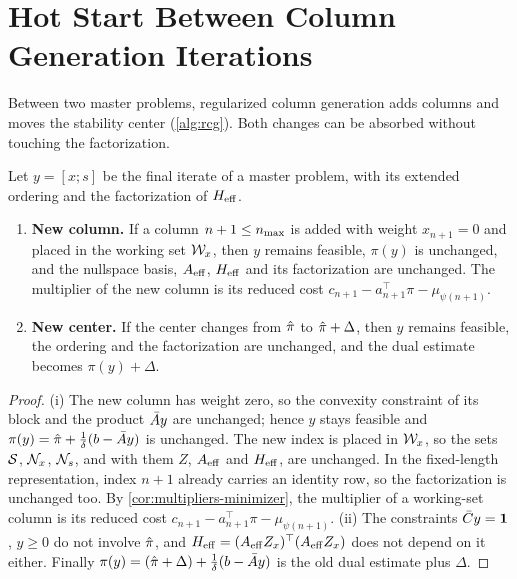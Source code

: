 \section{Hot Start Between Column Generation Iterations}
\label{sec:hot-start}

Between two master problems, regularized column generation adds columns and moves the
stability center (\cref{alg:rcg}). Both changes can be absorbed without touching the
factorization.

\begin{theorem} \label{thm:hot-start}
Let $y = [x;s]$ be the final iterate of a master problem, with its extended ordering and the
factorization of $H_{\mathrm{eff}}$.
\begin{enumerate}
    \item \label{thm:hot-start:i} \textbf{New column.} If a column $n+1\le n_{\max}$ is added with weight $x_{n+1} = 0$
          and placed in the working set $\mathcal{W}_x$, then $y$ remains feasible, $\pi(y)$ is
          unchanged, and the nullspace basis, $A_{\mathrm{eff}}$, $H_{\mathrm{eff}}$ and its factorization are
          unchanged. The multiplier of the new column is its reduced cost
          $c_{n+1} - a_{n+1}^\top\pi - \mu_{\psi(n+1)}$.
    \item \label{thm:hot-start:ii} \textbf{New center.} If the center changes from $\hat{\pi}$ to $\hat{\pi} + \Delta$,
          then $y$ remains feasible, the ordering and the factorization are unchanged, and the
          dual estimate becomes $\pi(y) + \Delta$.
\end{enumerate}
\end{theorem}

\begin{proof}
(i) The new column has weight zero, so the convexity constraint of its block and the product
$\bar{A} y$ are unchanged; hence $y$ stays feasible and $\pi(y) = \hat{\pi} + \frac{1}{\delta}(b - \bar{A} y)$
is unchanged. The new index is placed in $\mathcal{W}_x$, so the sets $\mathcal{S}$, $\mathcal{N}_x$, $\mathcal{N}_s$, and with them
$Z$, $A_{\mathrm{eff}}$ and $H_{\mathrm{eff}}$, are unchanged. In the fixed-length representation, index $n+1$
already carries an identity row, so the factorization is unchanged too. By
\cref{cor:multipliers-minimizer}, the multiplier of a working-set column is its reduced cost
$c_{n+1} - a_{n+1}^\top\pi - \mu_{\psi(n+1)}$.
(ii) The constraints $\bar{C} y = \mathbf{1}$, $y\ge0$ do not involve $\hat{\pi}$, and
$H_{\mathrm{eff}} = (A_{\mathrm{eff}} Z_x)^\top(A_{\mathrm{eff}} Z_x)$ does not depend on it either. Finally
$\pi(y) = (\hat{\pi} + \Delta) + \frac{1}{\delta}(b - \bar{A} y)$ is the old dual estimate plus $\Delta$.
\end{proof}

